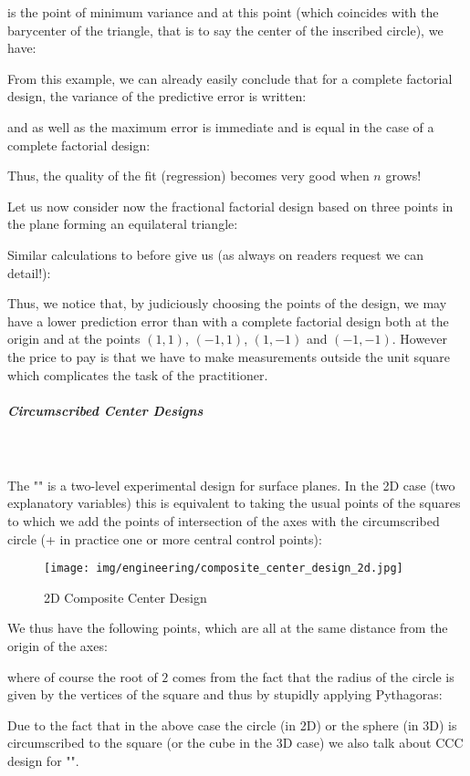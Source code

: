 	is the point of minimum variance and at this point (which coincides with the barycenter of the triangle, that is to say the center of the inscribed circle), we have:
	
 	From this example, we can already easily conclude that for a complete factorial design, the variance of the predictive error is written:
	
 	and as well as the maximum error is immediate and is equal in the case of a complete factorial design:
	
 	Thus, the quality of the fit (regression) becomes very good when $n$ grows!

	Let us now consider now the fractional factorial design based on three points in the plane forming an equilateral triangle:
	
	Similar calculations to before give us (as always on readers request we can detail!):
	
	Thus, we notice that, by judiciously choosing the points of the design, we may have a lower prediction error than with a complete factorial design both at the origin and at the points $(1, 1)$, $(-1,1)$, $(1, -1)$ and $(-1, -1)$. However the price to pay is that we have to make measurements outside the unit square which complicates the task of the practitioner.
	
	
	
	\subparagraph{Circumscribed Center Designs}\mbox{}\\\\
	The "" is a two-level experimental design for surface planes. In the 2D case (two explanatory variables) this is equivalent to taking the usual points of the squares to which we add the points of intersection of the axes with the circumscribed circle (+ in practice one or more central control points):	
	\begin{figure}[H]
		\centering
		\texttt{[image: img/engineering/composite\_center\_design\_2d.jpg]}	
		\caption{2D Composite Center Design}
	\end{figure}
	We thus have the following points, which are all at the same distance from the origin of the axes:
	
	where of course the root of $2$ comes from the fact that the radius of the circle is given by the vertices of the square and thus by stupidly applying Pythagoras:
	
 	Due to the fact that in the above case the circle (in 2D) or the sphere (in 3D) is circumscribed to the square (or the cube in the 3D case) we also talk about CCC design for "".

